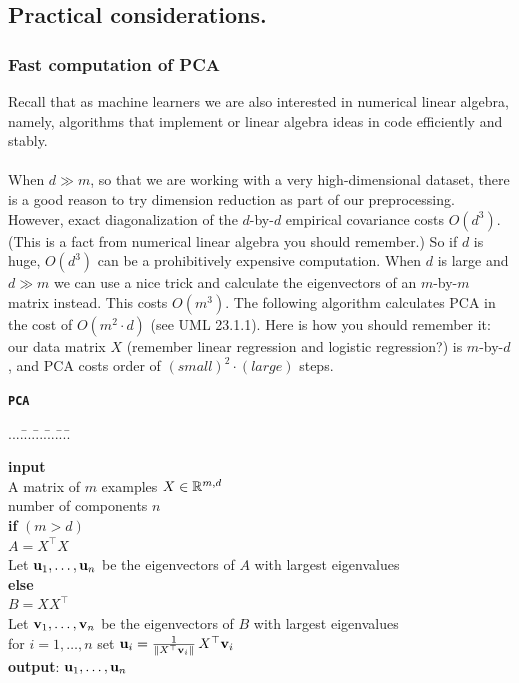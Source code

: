 \documentclass[11pt]{article}
\newenvironment{myalgo}[1]%
{
\begin{center}
\begin{boxedminipage}{0.8\linewidth}
\begin{center}
\textbf{\texttt{#1}}
\end{center}
\rm
\begin{tabbing}
....\=...\=...\=...\=...\=  \+ \kill
} %
{\end{tabbing} 
\end{boxedminipage} \end{center} %
}
\begin{document}
\subsection{Practical considerations.}

      \subsubsection{Fast computation of PCA}

  Recall that as machine learners we are also interested in numerical linear
  algebra, namely, algorithms that implement or linear algebra ideas in code
  efficiently and stably.
\\~\\
When $d\gg m$, so that we are working with a very high-dimensional dataset,
there is a good reason to try dimension reduction as part of our preprocessing.
However, exact diagonalization of the $d$-by-$d$ empirical covariance costs
$O(d^3)$. (This is a fact from numerical linear algebra you should remember.) So
if $d$ is huge, $O(d^3)$ can be a prohibitively expensive computation. 
When $d$ is large and $d\gg m$ we can use a nice trick and calculate the
eigenvectors of an $m$-by-$m$ matrix instead. This costs $O(m^3)$. The 
following algorithm calculates PCA in the cost of $O(m^2\cdot d)$ (see UML
23.1.1). 
Here is how
you should remember it: our data matrix $X$ (remember linear regression and
logistic regression?) is $m$-by-$d$, and PCA costs order of 
$(small)^2\cdot(large)$ steps. 



  \begin{myalgo}{PCA}
\textbf{input}~ \+ \\
A matrix of $m$ examples $X \in \mathbb{R}^{m,d}$  \\
number of components $n$ \- \\
\textbf{if} $(m > d)$ \+ \\
    $A = X^\top X$ \\ 
    Let ${\mathbf u}_1,\ldots,{\mathbf u}_n$ be the eigenvectors of $A$ with largest eigenvalues \- \\
\textbf{else} \+ \\
    $B = X X^\top$ \\
    Let ${\mathbf v}_1,\ldots,{\mathbf v}_n$ be the eigenvectors of $B$ with largest
    eigenvalues \\
    for $i=1,\ldots,n$ set ${\mathbf u}_i = \frac{1}{\|X^\top
      {\mathbf v}_i\|} \, X^\top {\mathbf v}_i$ \- \\
\textbf{output}: ${\mathbf u}_1,\ldots,{\mathbf u}_n$ 
\end{myalgo}
\end{document}
